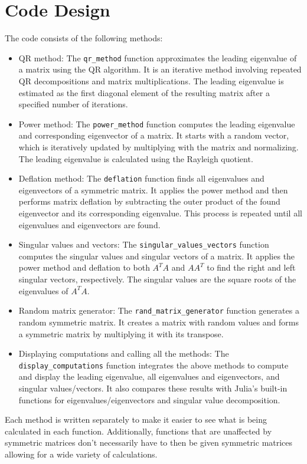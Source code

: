 \documentclass[11pt]{article}
\begin{document}
\section{Code Design}
The code consists of the following methods:
\begin{itemize}
    \item QR method: The \texttt{qr\_method} function approximates the leading eigenvalue of a matrix using the QR algorithm. It is an iterative method involving repeated QR decompositions and matrix multiplications. The leading eigenvalue is estimated as the first diagonal element of the resulting matrix after a specified number of iterations.
    \item Power method: The \texttt{power\_method} function computes the leading eigenvalue and corresponding eigenvector of a matrix. It starts with a random vector, which is iteratively updated by multiplying with the matrix and normalizing. The leading eigenvalue is calculated using the Rayleigh quotient.
    \item Deflation method: The \texttt{deflation} function finds all eigenvalues and eigenvectors of a symmetric matrix. It applies the power method and then performs matrix deflation by subtracting the outer product of the found eigenvector and its corresponding eigenvalue. This process is repeated until all eigenvalues and eigenvectors are found.
    \item Singular values and vectors: The \texttt{singular\_values\_vectors} function computes the singular values and singular vectors of a matrix. It applies the power method and deflation to both \( A^TA \) and \( AA^T \) to find the right and left singular vectors, respectively. The singular values are the square roots of the eigenvalues of \( A^TA \).
    \item Random matrix generator: The \texttt{rand\_matrix\_generator} function generates a random symmetric matrix. It creates a matrix with random values and forms a symmetric matrix by multiplying it with its transpose.
    \item Displaying computations and calling all the methods: The \texttt{display\_computations} function integrates the above methods to compute and display the leading eigenvalue, all eigenvalues and eigenvectors, and singular values/vectors. It also compares these results with Julia's built-in functions for eigenvalues/eigenvectors and singular value decomposition.
\end{itemize}
Each method is written separately to make it easier to see what is being calculated in each function. Additionally, functions that are unaffected by symmetric matrices don't necessarily have to then be given symmetric matrices allowing for a wide variety of calculations.
\end{document}
